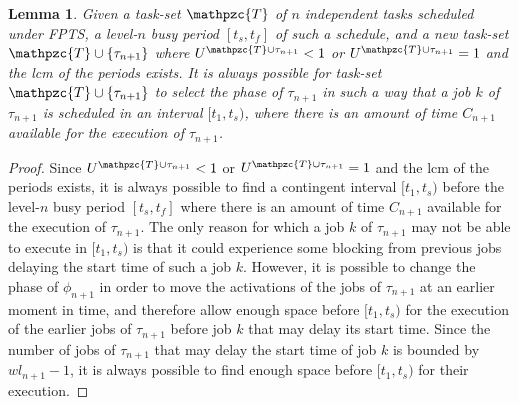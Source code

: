 \documentclass[fleqn]{article}
\newtheorem{lemma}{Lemma}
\begin{document}

\begin{lemma}
	Given a task-set $\mathpzc{T}$ of $n$ independent tasks scheduled under FPTS, a level-$n$ busy period $[t_s,t_f]$ of such a schedule, and a new task-set $\mathpzc{T} \cup \{\tau_{n+1}\}$ where $U^{\mathpzc{T} \cup \tau_{n+1}}<1$ or $U^{\mathpzc{T} \cup \tau_{n+1}} = 1$ and the lcm of the periods exists. It is always possible for task-set $\mathpzc{T} \cup \{\tau_{n+1}\}$ to select the phase of $\tau_{n+1}$ in such a way that a job $k$ of $\tau_{n+1}$ is scheduled in an interval $[t_1,t_s)$, where there is an amount of time $C_{n+1}$ available for the execution of $\tau_{n+1}$.
\end{lemma}

\begin{proof}
	Since $U^{\mathpzc{T} \cup \tau_{n+1}}<1$ or $U^{\mathpzc{T} \cup \tau_{n+1}} = 1$ and the lcm of the periods exists, it is always possible to find a contingent interval $[t_1,t_s)$ before the level-$n$ busy period $[t_s,t_f]$ where there is an amount of time $C_{n+1}$ available for the execution of $\tau_{n+1}$. The only reason for which a job $k$ of $\tau_{n+1}$ may not be able to execute in $[t_1,t_s)$ is that it could experience some blocking from previous jobs delaying the start time of such a job $k$. However, it is possible to change the phase of $\phi_{n+1}$ in order to move the activations of the jobs of $\tau_{n+1}$ at an earlier moment in time, and therefore allow enough space before $[t_1,t_s)$ for the execution of the earlier jobs of $\tau_{n+1}$ before job $k$ that may delay its start time. Since the number of jobs of $\tau_{n+1}$ that may delay the start time of job $k$ is bounded by $wl_{n+1}-1$, it is always possible to find enough space before $[t_1,t_s)$ for their execution.
\end{proof}
\end{document}
